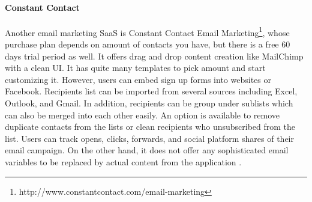 \paragraph{Constant Contact}
Another email marketing \ac{SaaS} is Constant Contact Email Marketing\footnote{http://www.constantcontact.com/email-marketing}, whose purchase plan depends on amount of contacts you have, but there is a free 60 days trial period as well. It offers drag and drop content creation like MailChimp with a clean \ac{UI}. It has quite many templates to pick amount and start customizing it. However, users can embed sign up forms into websites or Facebook. Recipients list can be imported from several sources including Excel, Outlook, and Gmail. In addition, recipients can be group under sublists which can also be merged into each other easily. An option is available to remove duplicate contacts from the lists or clean recipients who unsubscribed from the list. Users can track opens, clicks, forwards, and social platform shares of their email campaign. On the other hand, it does not offer any sophisticated email variables to be replaced by actual content from the application \citep{ConstantContactInc.2013,ConstantContactInc.2013a}. 

